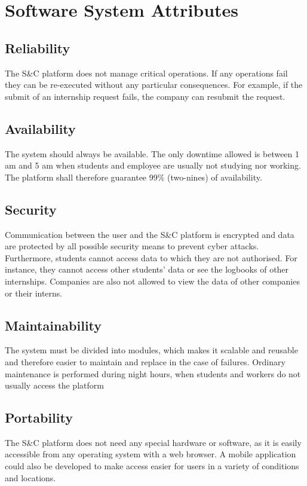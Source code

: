 \section{Software System Attributes}
\subsection{Reliability}
The S\&C platform does not manage critical operations. If any operations fail they can be re-executed without any particular consequences. For example, if the submit of an internship request fails, the company can resubmit the request.
\subsection{Availability}
The system should always be available. The only downtime allowed is between 1 am and 5 am when students and employee are usually not studying nor working. The platform shall therefore guarantee 99\% (two-nines) of availability.
\subsection{Security}
Communication between the user and the S\&C platform is encrypted and data are protected by all possible security means to prevent cyber attacks. Furthermore, students cannot access data to which they are not authorised. For instance, they cannot access other students' data or see the logbooks of other internships. Companies are also not allowed to view the data of other companies or their interns.
\subsection{Maintainability}
The system must be divided into modules, which makes it scalable and reusable and therefore easier to maintain and replace in the case of failures. Ordinary maintenance is performed during night hours, when students and workers do not usually access the platform
\subsection{Portability}
The S\&C platform does not need any special hardware or software, as it is easily accessible from any operating system with a web browser. A mobile application could also be developed to make access easier for users in a variety of conditions and locations.